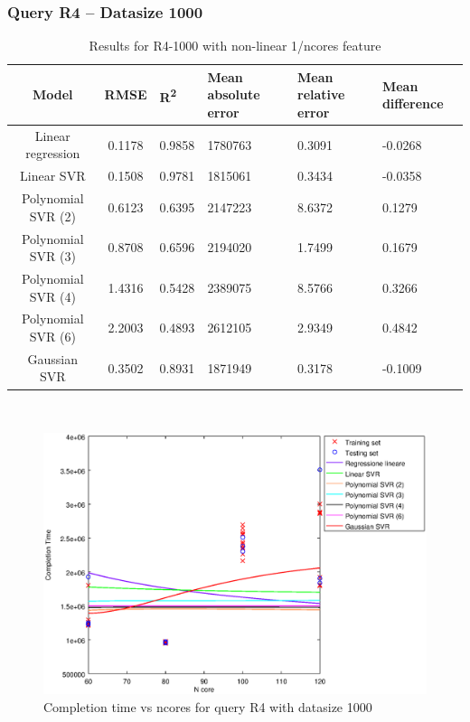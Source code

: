 \documentclass[a4paper,11pt]{article}
\begin{document}
\newpage
\subsubsection{Query R4 -- Datasize 1000}
\begin{table}[H]
	\centering
	\begin{adjustbox}{center}
		\begin{tabular}{c | c M{1.2cm} M{2.5cm} M{2.5cm} M{1.8cm}}
			Model & RMSE & R\textsuperscript{2} & Mean absolute error & Mean relative error & Mean difference \tabularnewline
			\hline
			Linear regression & 0.1178 & 0.9858 & 1780763 & 0.3091 & -0.0268 \\
			Linear SVR & 0.1508 & 0.9781 & 1815061 & 0.3434 & -0.0358 \\
			Polynomial SVR (2) & 0.6123 & 0.6395 & 2147223 & 8.6372 & 0.1279 \\
			Polynomial SVR (3) & 0.8708 & 0.6596 & 2194020 & 1.7499 & 0.1679 \\
			Polynomial SVR (4) & 1.4316 & 0.5428 & 2389075 & 8.5766 & 0.3266 \\
			Polynomial SVR (6) & 2.2003 & 0.4893 & 2612105 & 2.9349 & 0.4842 \\
			Gaussian SVR & 0.3502 & 0.8931 & 1871949 & 0.3178 & -0.1009 \\
		\end{tabular}
	\end{adjustbox}
	\\
	\caption{Results for R4-1000 with non-linear 1/ncores feature}
	\label{table_R4_prediction_all}
\end{table}

\begin {figure}[hbtp]
\centering
\includegraphics[width=\textwidth]{output/R4_1000_1_OVER_NCORES/plot_R4_1000.eps}
\caption {Completion time vs ncores for query R4 with datasize 1000}
\end {figure}
\end{document}
